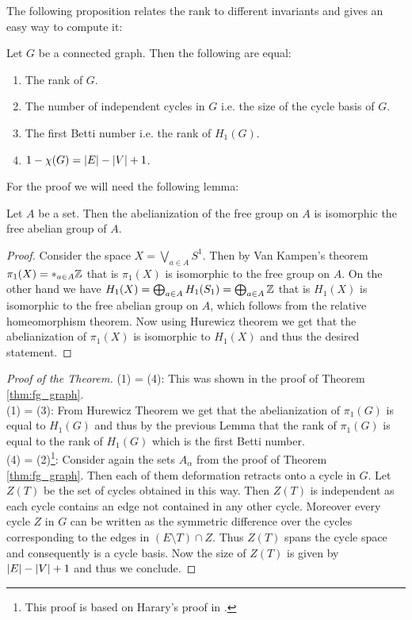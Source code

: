 The following proposition relates the rank to different invariants and gives an easy way to compute it: 
\begin{proposition}\label{prop:rank}
	Let $G$ be a connected graph. Then the following are equal:
	\begin{enumerate}
		\item The rank of $G$.
		\item The number of independent cycles in $G$ i.e. the size of the cycle basis of $G$.
		\item The first Betti number i.e. the rank of $H_{1}(G)$.
		\item $1 - \chi(G) = \abs{E} - \abs{V} + 1$.
	\end{enumerate}
\end{proposition}

For the proof we will need the following lemma:
\begin{lemma}
	Let $A$ be a set. Then the abelianization of the free group on $A$ is isomorphic the free abelian group of $A$.
\end{lemma}

\begin{proof}
	Consider the space $X = \bigvee_{a \in A} S^{1}$. Then by Van Kampen's theorem $\pi_1(X) = *_{a \in A} \mathbb{Z}$ that is $\pi_1(X)$ is isomorphic to the free group on $A$.
	On the other hand we have $H_1(X) = \bigoplus_{a \in A} H_1(S_1) = \bigoplus_{a \in A} \mathbb{Z}$ that is $H_1(X)$ is isomorphic to the free abelian group on $A$, 
	which follows from the relative homeomorphism theorem.
	Now using Hurewicz theorem we get that the abelianization of $\pi_1(X)$ is isomorphic to $H_1(X)$ and thus the desired statement.
\end{proof}

\begin{proof}[Proof of the Theorem]
	(1) = (4): This was shown in the proof of Theorem \ref{thm:fg_graph}.\\
	(1) = (3): From Hurewicz Theorem we get that the abelianization of $\pi_{1}(G)$ is equal to $H_{1}(G)$
	and thus by the previous Lemma that the rank of $\pi_1(G)$ is equal to the rank of $H_1(G)$ which is the first Betti number.\\
	(4) = (2)\footnote{This proof is based on Harary's proof in \cite[p. 37-40]{harary69}.}:
		Consider again the sets $A_{\alpha}$ from the proof of Theorem \ref{thm:fg_graph}. Then each of them deformation retracts onto a cycle in $G$.
	Let $Z(T)$ be the set of cycles obtained in this way. Then  $Z(T)$ is independent as each cycle contains an edge not contained in any other cycle.
	Moreover every cycle $Z$ in $G$ can be written as the symmetric difference over the cycles corresponding to the edges in $(E \setminus T) \cap Z$.
	Thus $Z(T)$ spans the cycle space and consequently is a cycle basis. Now the size of $Z(T)$ is given by $\abs{E} - \abs{V} + 1$ and thus we conclude.
\end{proof}

